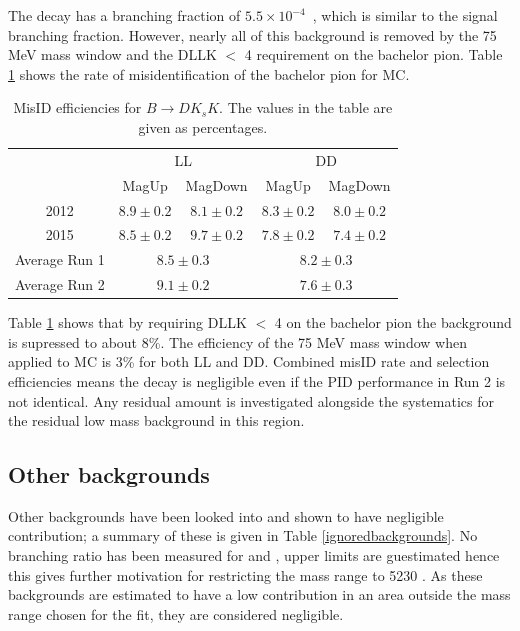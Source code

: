 The decay \decay{\B}{\D\KS\kaon} has a branching fraction of $5.5 \times 10^{-4}$~\cite{PDG2014}, which is similar to the signal branching fraction. However, nearly all of this background is removed by the 75 MeV \Kstarpm mass window and the DLLK $<$ 4 requirement on the bachelor pion. Table \ref{b2dkkspid} shows the rate of misidentification of the bachelor pion for \decay{\B}{\D\KS\kaon} MC.

\begin{table}[h]
\centering
\begin{tabular}{c|cc|cc}
\hline
& \multicolumn{2}{c}{LL} & \multicolumn{2}{c}{DD} \\
& MagUp & MagDown & MagUp & MagDown \\
\hline
2012 & $8.9 \pm 0.2$ & $8.1 \pm 0.2$ & $8.3 \pm 0.2$ & $8.0 \pm 0.2$ \\
2015 & $8.5 \pm 0.2$ & $9.7 \pm 0.2$ & $7.8 \pm 0.2$ & $7.4 \pm 0.2$ \\
\hline
Average Run 1 & \multicolumn{2}{c}{$8.5 \pm 0.3$} & \multicolumn{2}{c}{$8.2 \pm 0.3$} \\
Average Run 2 & \multicolumn{2}{c}{$9.1 \pm 0.2$} & \multicolumn{2}{c}{$7.6 \pm 0.3$} \\
\hline
\end{tabular}
\caption{MisID efficiencies for $B \to DK_sK$. The values in the table are given as percentages.}
\label{b2dkkspid}
\end{table}

Table \ref{b2dkkspid} shows that by requiring DLLK $<$ 4 on the bachelor pion the background is supressed to about 8\%. The efficiency of the 75 MeV \Kstarpm mass window when applied to \decay{\B}{\D\KS\kaon} MC is 3\% for both LL and DD. Combined misID rate and selection efficiencies means the decay is negligible even if the PID performance in Run 2 is not identical. Any residual amount is investigated alongside the systematics for the residual low mass background in this region.


\subsection{Other backgrounds}

Other backgrounds have been looked into and shown to have negligible contribution; a summary of these is given in Table \ref{ignoredbackgrounds}. No branching ratio has been measured for \decay{\Bm}{\Dz\Kstarm\piz} and \decay{\Bs}{\Dz\KS\pi\pi}, upper limits are guestimated hence this gives further motivation for restricting the mass range to 5230 \mevcc. As these backgrounds are estimated to have a low contribution in an area outside the mass range chosen for the \CP fit, they are considered negligible.

